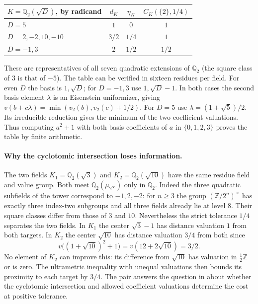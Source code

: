 \begin{center}
\begin{tabular}{@{}lccc@{}}\toprule
$K=\mathbb Q_2(\sqrt D)$, by radicand & $d_K$ & $\eta_K$ & $C_K(\{2\},1/4)$\\\midrule
$D=5$ & $1$ & $0$ & $1$\\
$D=2,-2,10,-10$ & $3/2$ & $1/4$ & $1$\\
$D=-1,3$ & $2$ & $1/2$ & $1/2$\\\bottomrule
\end{tabular}
\end{center}
\noindent These are representatives of all seven quadratic extensions of $\mathbb Q_2$ (the square class of $3$ is that of $-5$). The table can be verified in sixteen residues per field. For even $D$ the basis is $1,\sqrt D$; for $D=-1,3$ use $1,\sqrt D-1$. In both cases the second basis element $\lambda$ is an Eisenstein uniformizer, giving $v(b+c\lambda)=\min(v_2(b),v_2(c)+1/2)$. For $D=5$ use $\lambda=(1+\sqrt5)/2$. Its irreducible reduction gives the minimum of the two coefficient valuations. Thus computing $a^2+1$ with both basis coefficients of $a$ in $\{0,1,2,3\}$ proves the table by finite arithmetic.

\paragraph{Why the cyclotomic intersection loses information.}
The two fields $K_1=\mathbb Q_2(\sqrt3)$ and $K_2=\mathbb Q_2(\sqrt{10})$ have the same residue field and value group. Both meet $\mathbb Q_2(\mu_{2^\infty})$ only in $\mathbb Q_2$. Indeed the three quadratic subfields of the tower correspond to $-1,2,-2$: for $n\ge3$ the group $(\mathbb Z/2^n)^\times$ has exactly three index-two subgroups and all three fields already lie at level $8$. Their square classes differ from those of $3$ and $10$. Nevertheless the strict tolerance $1/4$ separates the two fields. In $K_1$ the center $\sqrt3-1$ has distance valuation $1$ from both targets. In $K_2$ the center $\sqrt{10}$ has distance valuation $3/4$ from both since
\[
 v\big((1+\sqrt{10})^2+1\big)=v(12+2\sqrt{10})=3/2 .
\]
No element of $K_2$ can improve this: its difference from $\sqrt{10}$ has valuation in $\tfrac12\mathbb Z$ or is zero. The ultrametric inequality with unequal valuations then bounds its proximity to each target by $3/4$. The pair answers the question in \cite{packet} about whether the cyclotomic intersection and allowed coefficient valuations determine the cost at positive tolerance.

